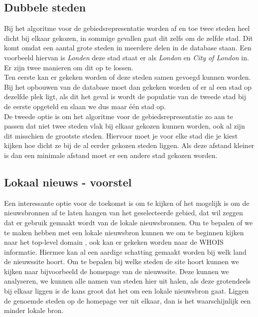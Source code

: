 \documentclass[twoside,openright]{uva-bachelor-thesis}
\begin{document}
		\subsection{Dubbele steden}
			\label{sec:multcities}
			Bij het algoritme voor de gebiedsrepresentatie worden af en toe twee steden heel dicht bij elkaar gekozen, in sommige gevallen gaat dit zelfs om de zelfde stad. Dit komt omdat een aantal grote steden in meerdere delen in de database staan. Een voorbeeld hiervan is \textit{Londen} deze stad staat er als \textit{London} en \textit{City of London} in. Er zijn twee manieren om dit op te lossen.\\[0.5cm]
			Ten eerste kan er gekeken worden of deze steden samen gevoegd kunnen worden. Bij het opbouwen van de database moet dan gekeken worden of er al een stad op dezelfde plek ligt, als dit het geval is wordt de populatie van de tweede stad bij de eerste opgeteld en slaan we dus maar \'e\'en stad op.\\[0.5cm]
			De tweede optie is om het algoritme voor de gebiedsrepresentatie zo aan te passen dat niet twee steden vlak bij elkaar gekozen kunnen worden, ook al zijn dit misschien de grootste steden. Hiervoor moet je voor elke stad die je kiest kijken hoe dicht ze bij de al eerder gekozen steden liggen. Als deze afstand kleiner is dan een minimale afstand moet er een andere stad gekozen worden.
		\subsection{Lokaal nieuws - voorstel}
			\label{sec:localnews}
			Een interessante optie voor de toekomst is om te kijken of het mogelijk is om de nieuwsbronnen af te laten hangen van het geselecteerde gebied, dat wil zeggen dat er gebruik gemaakt wordt van de lokale nieuwsbronnen. Om te bepalen of we te maken hebben met een lokale nieuwsbron kunnen we om te beginnen kijken naar het top-level domain \cite{Toplvl}, ook kan er gekeken worden naar de WHOIS \cite{WHOIS} informatie. Hiermee kan al een aardige schatting gemaakt worden bij welk land de nieuwssite hoort. Om te bepalen bij welke steden de site hoort kunnen we kijken naar bijvoorbeeld de homepage van de nieuwssite. Deze kunnen we analyseren, we kunnen alle namen van steden hier uit halen, als deze grotendeels bij elkaar liggen is de kans groot dat het om een lokale nieuwsbron gaat. Liggen de genoemde steden op de homepage ver uit elkaar, dan is het waarschijnlijk een minder lokale bron.
\end{document}
